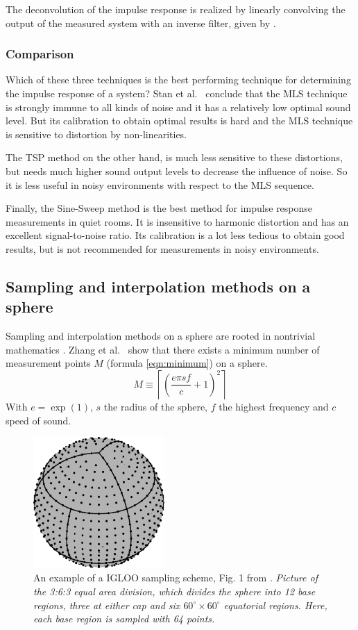 The deconvolution of the impulse response is realized by linearly convolving the output of the measured system with an inverse filter, given by \cite{Stan2002249}.

\subsubsection{Comparison}
Which of these three techniques is the best performing technique for determining the impulse response of a system? Stan et al.\ \cite{Stan2002249} conclude that the MLS technique is strongly immune to all kinds of noise and it has a relatively low optimal sound level. But its calibration to obtain optimal results is hard and the MLS technique is sensitive to distortion by non-linearities.

The TSP method on the other hand, is much less sensitive to these distortions, but needs much higher sound output levels to decrease the influence of noise. So it is less useful in noisy environments with respect to the MLS sequence.

Finally, the Sine-Sweep method is the best method for impulse response measurements in quiet rooms. It is insensitive to harmonic distortion and has an excellent signal-to-noise ratio. Its calibration is a lot less tedious to obtain good results, but is not recommended for measurements in noisy environments.

\subsection{Sampling and interpolation methods on a sphere}
Sampling and interpolation methods on a sphere are rooted in nontrivial mathematics \cite{Marzo2014}. Zhang et al.\ \cite{Zhang2012575} show that there exists a minimum number of measurement points $M$ (formula \ref{eqn:minimum}) on a sphere.
\begin{equation}
\label{eqn:minimum}
M\equiv\left\lceil\left(\dfrac{e\pi sf}{c}+1\right)^2\right\rceil
\end{equation}
With $e=\exp(1)$, $s$ the radius of the sphere, $f$ the highest frequency and $c$ speed of sound.

\begin{figure}[b!]
    \centering
    \includegraphics[width=5cm]{images/Directivity_IGLOO.png}
    \caption{An example of a IGLOO sampling scheme, Fig. 1 from \cite{Zhang2012575}. \textit{Picture of the 3:6:3 equal area division, which divides the sphere into 12 base regions, three at either cap and six $60^\circ\times60^\circ$ equatorial regions. Here, each base region is sampled with 64 points.}}
    \label{fig:IGLOO}
\end{figure}

